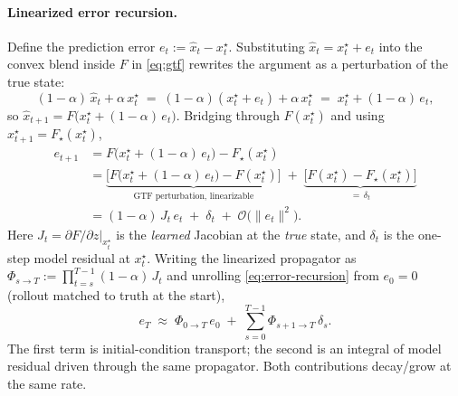 \paragraph{Linearized error recursion.}
Define the prediction error $e_t := \hat{x}_t - x_t^\star$.
Substituting $\hat{x}_t = x_t^\star + e_t$ into the convex blend
inside $F$ in \eqref{eq:gtf} rewrites the argument as a perturbation
of the true state:
%
\begin{equation}
  (1-\alpha)\,\hat{x}_t + \alpha\,x_t^\star
  \;=\; (1-\alpha)(x_t^\star + e_t) + \alpha\,x_t^\star
  \;=\; x_t^\star + (1-\alpha)\,e_t,
  \label{eq:blend-rewrite}
\end{equation}
%
so $\hat{x}_{t+1} = F\bigl(x_t^\star + (1-\alpha)\,e_t\bigr)$.
Bridging through $F(x_t^\star)$ and using
$x_{t+1}^\star = F_\star(x_t^\star)$,
%
\begin{align}
  e_{t+1}
  &= F\!\bigl(x_t^\star + (1-\alpha)\,e_t\bigr) - F_\star(x_t^\star)
    \nonumber \\
  &= \underbrace{\bigl[F\!\bigl(x_t^\star + (1-\alpha)\,e_t\bigr)
    - F(x_t^\star)\bigr]}_{\text{GTF perturbation, linearizable}}
    \;+\;
    \underbrace{\bigl[F(x_t^\star) - F_\star(x_t^\star)\bigr]}_{=\,\delta_t}
    \nonumber \\
  &= (1-\alpha)\,J_t\,e_t \;+\; \delta_t \;+\; \mathcal{O}\!\bigl(\|e_t\|^2\bigr).
  \label{eq:error-recursion}
\end{align}
%
Here $J_t = \partial F/\partial z|_{x_t^\star}$ is the \emph{learned}
Jacobian at the \emph{true} state, and $\delta_t$ is the one-step
model residual at $x_t^\star$.
%
Writing the linearized propagator as
$\Phi_{s\to T} := \prod_{t=s}^{T-1} (1-\alpha)\,J_t$ and unrolling
\eqref{eq:error-recursion} from $e_0 = 0$ (rollout matched to truth at
the start),
%
\begin{equation}
  e_T \;\approx\; \Phi_{0\to T}\,e_0
  \;+\; \sum_{s=0}^{T-1} \Phi_{s+1\to T}\,\delta_s.
  \label{eq:error-product}
\end{equation}
%
The first term is initial-condition transport; the second is an
integral of model residual driven through the same propagator. Both
contributions decay/grow at the same rate.

